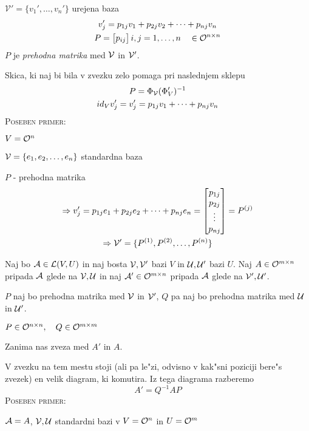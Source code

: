 $\mathcal{V'} = \{v_1', \ldots, v_n'\}$ urejena baza
\begin{gather*}
v_j' = p_{1j} v_1 + p_{2j}v_2 + \cdots + p_{nj}v_n \\
P = \begin{bmatrix}p_{ij}\end{bmatrix} i,j = 1, \ldots, n \quad \in \mathcal{O}^{n \times n}
\end{gather*}
$P$ je \emph{prehodna matrika} med $\mathcal{V}$ in $\mathcal{V}'$.

Skica, ki naj bi bila v zvezku zelo pomaga pri naslednjem sklepu
\begin{gather*}
P = \Phi_{\mathcal{V}} (\Phi_V')^{-1} \\
id_V v_j' = v_j' = p_{1j}v_1 + \cdots + p_{nj}v_n
\end{gather*}
%
\textsc{Poseben primer:}

$V = \mathcal{O}^n$

$\mathcal{V} = \{e_1, e_2, \ldots, e_n\}$ standardna baza

$P$ - prehodna matrika
\begin{gather*}
\Rightarrow v_j' = p_{1j}e_1 + p_{2j}e_2 + \cdots + p_{nj}e_n = \begin{bmatrix}p_{1j} \\ p_{2j} \\ \vdots \\ p_{nj}\end{bmatrix} = P^{(j)} \\
\Rightarrow \mathcal{V}' = \{P^{(1)}, P^{(2)}, \ldots, P^{(n)}\}
\end{gather*}

Naj bo $\mathcal{A} \in \mathcal{L} (V, U)$ in naj bosta $\mathcal{V} , \mathcal{V} '$ bazi $V$ in $\mathcal{U}, \mathcal{U}'$  bazi $U$. Naj $A \in \mathcal{O}^{m \times n}$ pripada $\mathcal{A}$ glede na $\mathcal{V}, \mathcal{U}$ in naj $\mathcal{A}' \in \mathcal{O}^{m \times n}$ pripada $\mathcal{A}$ glede na $\mathcal{V}', \mathcal{U}'$.

$P$ naj bo prehodna matrika med $\mathcal{V}$ in $\mathcal{V}'$, $Q$ pa naj bo prehodna matrika med $\mathcal{U}$ in $\mathcal{U}'$.

$P \in \mathcal{O}^{n \times n}, \quad Q \in \mathcal{O}^{m \times m}$

Zanima nas zveza med $A'$ in $A$.

V zvezku na tem mestu stoji (ali pa le"zi, odvisno v kak"sni poziciji bere"s zvezek) en velik diagram, ki komutira. Iz tega diagrama razberemo
\begin{equation*}
A' = Q^{-1}AP
\end{equation*}
%
\textsc{Poseben primer:}

$\mathcal{A} = A$, $\mathcal{V}, \mathcal{U}$ standardni bazi v $V = \mathcal{O}^n$ in $U = \mathcal{O}^m$

